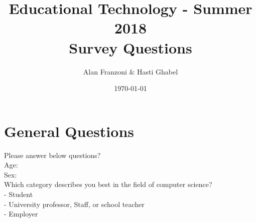 \documentclass[12pt,a4paper,titlepage]{article}
\title{\blue Educational Technology - Summer 2018 \\
\blueb Survey Questions}
\author{Alan Franzoni \& Hasti Ghabel}
\date{\today}
\begin{document}
\maketitle

\section {General Questions}

Please  answer below questions?\\
Age:\\
Sex:\\
Which category describes you best in the field of computer science?\\
-  Student\\
-  University professor, Staff, or school teacher\\
-  Employer\\
\end{document}
